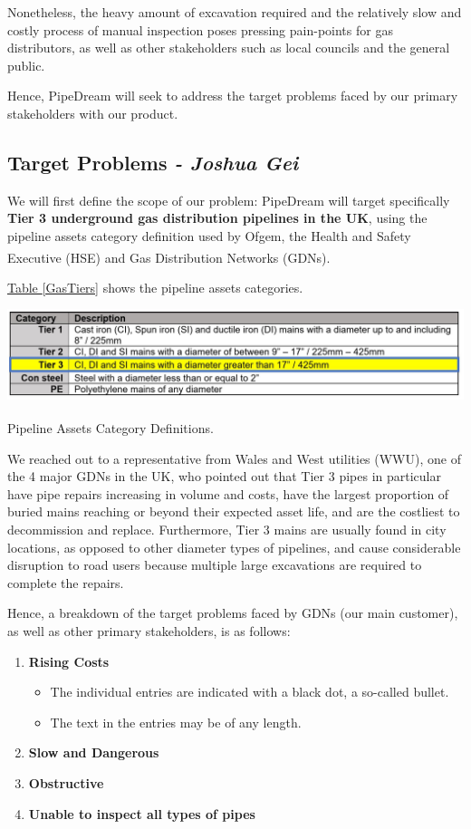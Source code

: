 \documentclass[11pt]{article}		%
\newcommand{\supercite}[1]{\textsuperscript{\cite{#1}}}		%
\newcommand{\tableref}[1]{\hyperref[#1]{Table \ref*{#1}}}     %
\begin{document}
		Nonetheless, the heavy amount of excavation required and the relatively slow and costly process of manual inspection poses pressing pain-points for gas distributors, as well as other stakeholders such as local councils and the general public. 
		
		Hence, PipeDream will seek to address the target problems faced by our primary stakeholders with our product. 

	\subsection[Target Problems]{Target Problems \textit{- Joshua Gei}}
		We will first define the scope of our problem: PipeDream will target specifically \textbf{Tier 3 underground gas distribution pipelines in the UK}, using the pipeline assets category definition used by Ofgem, the Health and Safety Executive (HSE) and Gas Distribution Networks (GDNs)\supercite{pct2020states}. 
		
		\tableref{GasTiers} shows the pipeline assets categories. 
		
		\begin{table}[h]
			\centering
			\includegraphics[width=\textwidth]{GasTiers}
			\caption{Pipeline Assets Category Definitions\supercite{pct2020states}.}
			\label{GasTiers}
 		\end{table}
    
		We reached out to a representative from Wales and West utilities (WWU), one of the 4 major GDNs in the UK, who pointed out that Tier 3 pipes in particular have pipe repairs increasing in volume and costs, have the largest proportion of buried mains reaching or beyond their expected asset life, and are the costliest to decommission and replace. Furthermore, Tier 3 mains are usually found in city locations, as opposed to other diameter types of pipelines, and cause considerable disruption to road users because multiple large excavations are required to complete the repairs.
		
		Hence, a breakdown of the target problems faced by GDNs (our main customer), as well as other primary stakeholders, is as follows: 

		\begin{enumerate}
		   \item \textbf{Rising Costs}
		   \begin{itemize}
		     \item The individual entries are indicated with a black dot, a so-called bullet.
		     \item The text in the entries may be of any length.
		   \end{itemize}
		   \item \textbf{Slow and Dangerous}
		   \item \textbf{Obstructive}
		   \item \textbf{Unable to inspect all types of pipes}
		\end{enumerate}
\end{document}
